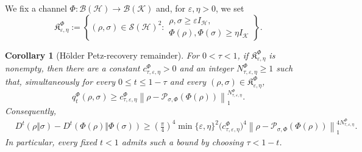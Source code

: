 \documentclass[11pt]{article}
\newtheorem{corollary}[corollary]{Corollary}
\theoremstyle{remark}
\newcommand{\1}{\mathbbm{1}}
\begin{document}
We fix a channel
$\Phi:\mathcal B(\mathcal H)\to\mathcal B(\mathcal K)$ and, for
$\varepsilon,\eta>0$, we set
\begin{equation}
 \mathfrak K_{\varepsilon,\eta}^{\Phi}
 :=\left\{(\rho,\sigma)\in\mathcal S(\mathcal H)^2:
 \begin{array}{c}
  \rho,\sigma\geq\varepsilon I_{\mathcal H},\\
  \Phi(\rho),\Phi(\sigma)\geq\eta I_{\mathcal K}
 \end{array}\right\}.
 \label{eq:consolidated-invertible-Petz-slab}
\end{equation}

\begin{corollary}[H\"older Petz-recovery remainder]
\label{cor:consolidated-nonmaximal-Petz-holder}
For $0<\tau<1$, if
$\mathfrak K_{\varepsilon,\eta}^{\Phi}$ is nonempty, then there are a
constant $c_{\tau,\varepsilon,\eta}^{\Phi}>0$ and an integer
$N_{\tau,\varepsilon,\eta}^{\Phi}\geq1$ such that, simultaneously
for every $0\leq t\leq1-\tau$ and every
$(\rho,\sigma)\in\mathfrak K_{\varepsilon,\eta}^{\Phi}$,
\begin{equation}
 q_t^\Phi(\rho,\sigma)
 \geq c_{\tau,\varepsilon,\eta}^{\Phi}
 \left\lVert\rho-
 \mathcal P_{\sigma,\Phi}(\Phi(\rho))\right\rVert_1^{
 N_{\tau,\varepsilon,\eta}^{\Phi}}.
 \label{eq:consolidated-qt-Petz-holder}
\end{equation}
Consequently,
\begin{equation}
 \boxed{
 \begin{aligned}
 &D^t(\rho\Vert\sigma)
 -D^t(\Phi(\rho)\Vert\Phi(\sigma))\geq
 \left(\frac\pi4\right)^4
 \min\{\varepsilon,\eta\}^{2}
 \bigl(c_{\tau,\varepsilon,\eta}^{\Phi}\bigr)^4
 \left\lVert\rho-
 \mathcal P_{\sigma,\Phi}(\Phi(\rho))\right\rVert_1^{
 4N_{\tau,\varepsilon,\eta}^{\Phi}} .
 \end{aligned}}
 \label{eq:consolidated-Dt-Petz-holder}
\end{equation}
In particular, every fixed $t<1$ admits such a bound by choosing
$\tau<1-t$.
\end{corollary}
\end{document}

